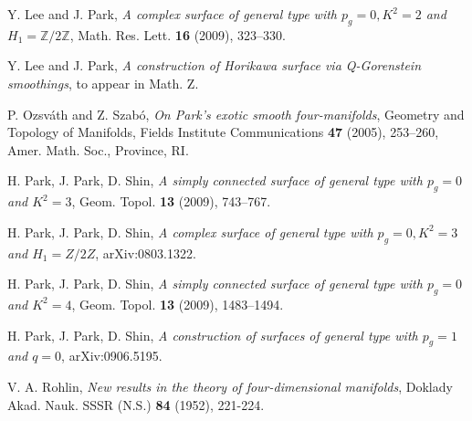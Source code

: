 \documentclass[twoside,11pt]{amsart}
\begin{document}
\begin{thebibliography}{99}
 Y. Lee and J. Park, {\it A complex surface of general type with $p_g=0, K^2=2$ and $H_1={{\mathbb Z}}/2{{\mathbb Z}}$},
                 Math. Res. Lett. {\bf 16} (2009), 323--330.

 Y. Lee and J. Park, {\it A construction of Horikawa surface via
                Q-Gorenstein smoothings}, to appear in Math. Z.

 P. Ozsv\'{a}th and Z. Szab\'{o}, {\it On Park's exotic smooth four-manifolds},
Geometry and Topology of Manifolds, Fields Institute Communications \textbf{47} (2005), 253--260, Amer. Math. Soc., Province, RI.

 H. Park, J. Park, D. Shin, {\it A simply connected surface of general type with $p_g=0$ and $K^2=3$},
              Geom. Topol. {\bf 13} (2009), 743--767.

 H. Park, J. Park, D. Shin, {\it A complex surface of general type with $p_g=0, K^2=3$ and
               $H_1=Z/2Z$}, arXiv:0803.1322.

 H. Park, J. Park, D. Shin, {\it A simply connected surface of general type with
               $p_g=0$ and $K^2=4$},  Geom. Topol. {\bf 13}  (2009), 1483--1494.

 H. Park, J. Park, D. Shin, {\it A construction of surfaces of general type with $p_g=1$ and
             $q=0$}, arXiv:0906.5195.

 V. A. Rohlin, {\it New results in the theory of four-dimensional
manifolds}, Doklady Akad. Nauk. SSSR (N.S.) {\bf 84} (1952),
221-224.

\end{thebibliography}
\end{document}
